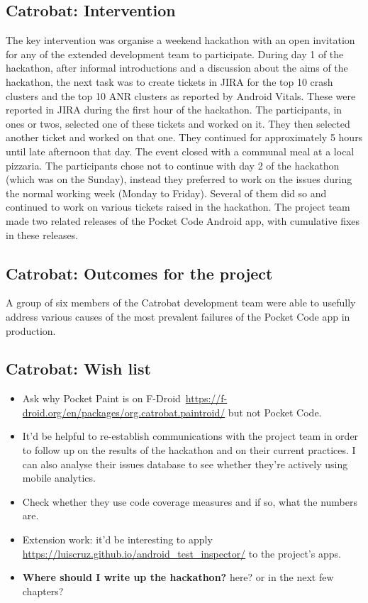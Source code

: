 \subsection{Catrobat: Intervention}
The key intervention was organise a weekend hackathon with an open invitation for any of the extended development team to participate. During day 1 of the hackathon, after informal introductions and a discussion about the aims of the hackathon, the next task was to create tickets in JIRA for the top 10 crash clusters and the top 10 ANR clusters as reported by Android Vitals. These were reported in JIRA during the first hour of the hackathon. The participants, in ones or twos, selected one of these tickets and worked on it. They then selected another ticket and worked on that one. They continued for approximately 5 hours until late afternoon that day. The event closed with a communal meal at a local pizzaria. The participants chose not to continue with day 2 of the hackathon (which was on the Sunday), instead they preferred to work on the issues during the normal working week (Monday to Friday). Several of them did so and continued to work on various tickets raised in the hackathon. The project team made two related releases of the Pocket Code Android app, with cumulative fixes in these releases.

\subsection{Catrobat: Outcomes for the project}
A group of six members of the Catrobat development team were able to usefully address various causes of the most prevalent failures of the Pocket Code app in production. 


\subsection*{Catrobat: Wish list}
{\small
\begin{itemize}
    \itemsep0em
    \item Ask why Pocket Paint is on F-Droid~\url{https://f-droid.org/en/packages/org.catrobat.paintroid/} but not Pocket Code.
    \item It'd be helpful to re-establish communications with the project team in order to follow up on the results of the hackathon and on their current practices. I can also analyse their issues database to see whether they're actively using mobile analytics.
    \item Check whether they use code coverage measures and if so, what the numbers are.
    \item Extension work: it'd be interesting to apply \url{https://luiscruz.github.io/android_test_inspector/} to the project's apps.
    \item \textbf{Where should I write up the hackathon?} here? or in the next few chapters?
\end{itemize}
}  %

